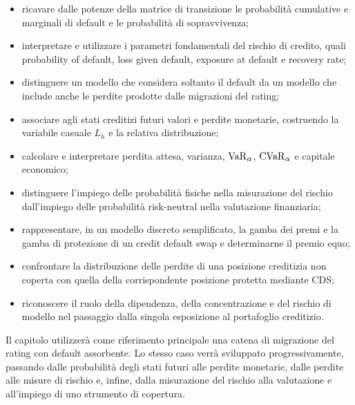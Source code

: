 \begin{itemize}

\item ricavare dalle potenze della matrice di transizione le
probabilit\`{a} cumulative e marginali di default e le
probabilit\`{a} di sopravvivenza;

\item interpretare e utilizzare i parametri fondamentali del rischio di
credito, quali probability of default, loss given default, exposure at
default e recovery rate;

\item distinguere un modello che considera soltanto il default da un
modello che include anche le perdite prodotte dalle migrazioni del
rating;

\item associare agli stati creditizi futuri valori e perdite monetarie,
costruendo la variabile casuale $L_h$ e la relativa distribuzione;

\item calcolare e interpretare perdita attesa, varianza,
$\operatorname{VaR}_{\alpha}$, $\operatorname{CVaR}_{\alpha}$ e capitale economico;

\item distinguere l'impiego delle probabilit\`{a} fisiche nella
misurazione del rischio dall'impiego delle probabilit\`{a} risk-neutral
nella valutazione finanziaria;

\item rappresentare, in un modello discreto semplificato, la gamba dei
premi e la gamba di protezione di un credit default swap e determinarne
il premio equo;

\item confrontare la distribuzione delle perdite di una posizione
creditizia non coperta con quella della corrispondente posizione
protetta mediante CDS;

\item riconoscere il ruolo della dipendenza, della concentrazione e del
rischio di modello nel passaggio dalla singola esposizione al
portafoglio creditizio.

\end{itemize}

Il capitolo utilizzer\`{a} come riferimento principale una catena di
migrazione del rating con default assorbente. Lo stesso caso verr\`{a}
sviluppato progressivamente, passando dalle probabilit\`{a} degli stati
futuri alle perdite monetarie, dalle perdite alle misure di rischio e,
infine, dalla misurazione del rischio alla valutazione e all'impiego di
uno strumento di copertura.

